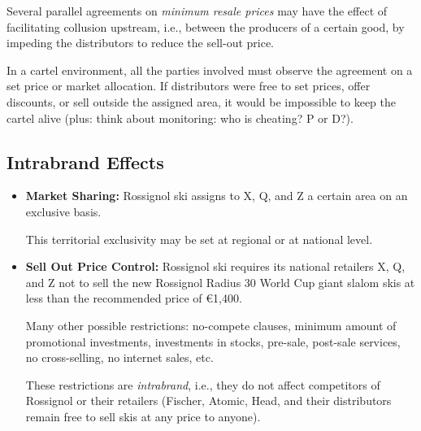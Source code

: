         Several parallel agreements on \emph{minimum resale prices} may have the effect of facilitating collusion upstream, i.e., between the producers of a certain good, by impeding the distributors to reduce the sell-out price.
        
        In a cartel environment, all the parties involved must observe the agreement on a set price or market allocation. If distributors were free to set prices, offer discounts, or sell outside the assigned area, it would be impossible to keep the cartel alive (plus: think about monitoring: who is cheating? P or D?).


    \subsection{Intrabrand Effects}

        \begin{itemize}
            \item \textbf{Market Sharing:} Rossignol ski assigns to X, Q, and Z a certain area on an exclusive basis.

                This territorial exclusivity may be set at regional or at national level.
                
            \item \textbf{Sell Out Price Control:} Rossignol ski requires its national retailers X, Q, and Z not to sell the new Rossignol Radius 30 World Cup giant slalom skis at less than the recommended price of €1,400.

            Many other possible restrictions: no-compete clauses, minimum amount of promotional investments, investments in stocks, pre-sale, post-sale services, no cross-selling, no internet sales, etc.

            These restrictions are \emph{intrabrand}, i.e., they do not affect competitors of Rossignol or their retailers (Fischer, Atomic, Head, and their distributors remain free to sell skis at any price to anyone).
        \end{itemize}


